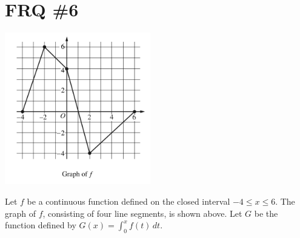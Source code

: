 \documentclass[11pt,letterpaper]{article}
\begin{document}
\section*{FRQ \#6}
\begin{center}
    \includegraphics[width=2.5in]{GraphG.png}
\end{center}
Let $f$ be a continuous function defined on the closed interval $−4 \leq x \leq 6$. The graph of $f$, consisting of four line segments, is shown above. Let $G$ be the function defined by $G(x)=\int_{0}^{x} f(t) \, dt$.
\end{document}
